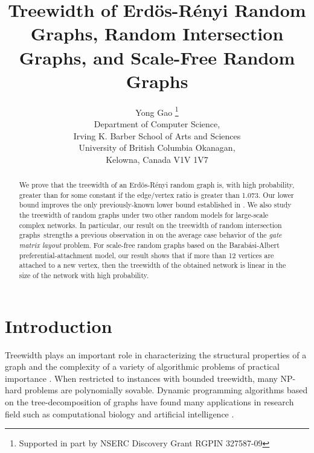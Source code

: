 \documentclass[11pt]{article}
\providecommand{\rigs}{random intersection graphs}
\begin{document}
 
\title{Treewidth of Erd\"{o}s-R\'{e}nyi Random Graphs, Random Intersection Graphs, and 
  Scale-Free Random Graphs
} 

 
\author{Yong Gao \thanks{Supported in part by NSERC Discovery Grant RGPIN 327587-09} \\
    Department of Computer Science, \\
    Irving K. Barber School of Arts and Sciences \\
    University of British Columbia Okanagan, \\
    Kelowna, Canada V1V 1V7 \\
}   
\maketitle 

\begin{abstract}
We prove that the treewidth of an Erd\"{o}s-R\'{e}nyi random graph  is, with
high probability, greater than  for some constant  if 
the edge/vertex ratio  is greater than 1.073. Our lower bound 
 improves the only previously-known lower bound established in \cite{kloks94}.  
We also study the treewidth of random graphs under two other random models for large-scale complex networks. In particular, our result on the treewidth of \rigs~strengths a previous observation in \cite{karonski99cpc} on the average case behavior of the \textit{gate matrix layout} problem. For scale-free random graphs based on the  Barab\'{a}si-Albert preferential-attachment model, our result shows that  if more than 12 vertices are attached to a new vertex, then the treewidth of the obtained network is linear in the size of the network with high probability.   
\end{abstract}
 

\section{Introduction}
\label{Introduction}
Treewidth plays an important role in characterizing the structural properties of a graph
and the complexity of a variety of algorithmic problems of practical importance
\cite{bodlaender93,kloks94}. When restricted to instances with bounded treewidth, 
many NP-hard problems are polynomially sovable. Dynamic programming algorithms based on the
tree-decomposition of graphs have found many applications in research field
such as computational biology and artificial intelligence \cite{dalmau02,dechter01}.
\end{document}

